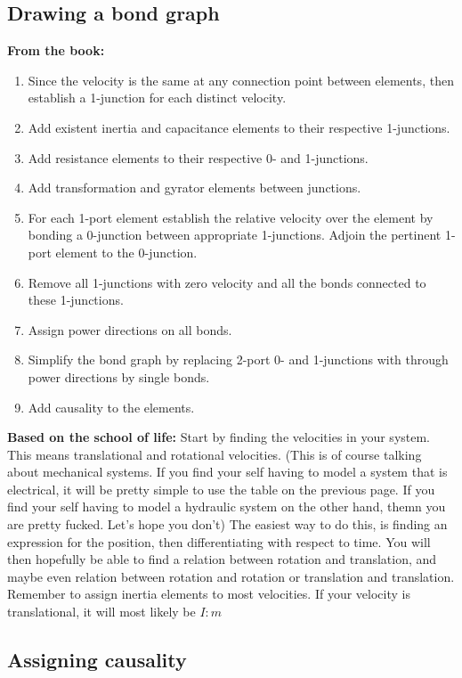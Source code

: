 \subsection{Drawing a bond graph}
\textbf{From the book: }
\begin{enumerate}
    \item Since the velocity is the same at any connection point between elements, then establish a 1-junction for each distinct velocity.
    \item Add existent inertia and capacitance elements to their respective 1-junctions.
    \item Add resistance elements to their respective 0- and 1-junctions.
    \item Add transformation and gyrator elements between junctions.
    \item For each 1-port element establish the relative velocity over the element by bonding a 0-junction between appropriate 1-junctions. Adjoin the pertinent 1-port element to the 0-junction.
    \item Remove all 1-junctions with zero velocity and all the bonds connected to these 1-junctions.
    \item Assign power directions on all bonds.
    \item Simplify the bond graph by replacing 2-port 0- and 1-junctions with through power directions by single bonds.
    \item Add causality to the elements.
\end{enumerate}
\textbf{Based on the school of life: }
Start by finding the velocities in your system. This means translational and rotational velocities. (This is of course talking about mechanical systems. If you find your self having to model a system that is electrical, it will be pretty simple to use the table on the previous page. If you find your self having to model a hydraulic system on the other hand, themn you are pretty fucked. Let's hope you don't)
The easiest way to do this, is finding an expression for the position, then differentiating with respect to time. You will then hopefully be able to find a relation between rotation and translation, and maybe even relation between rotation and rotation or translation and translation. Remember to assign inertia elements to most velocities. If your velocity is translational, it will most likely be $I : m$
\newpage
\subsection{Assigning causality}
\begin{figure}
    
\end{figure}